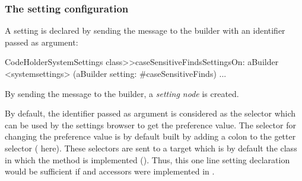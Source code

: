 \documentclass[a4paper,10pt,twoside]{book}
\begin{document}
\subsubsection{The setting configuration}
A setting is declared by sending the message  to the builder with an identifier passed as argument:
\begin{code}{}
CodeHolderSystemSettings class>>caseSensitiveFindsSettingsOn: aBuilder
	<systemsettings>
	(aBuilder setting: #caseSensitiveFinds) 
...
\end{code}
By sending the message  to the builder, a \textit{setting node} is created.

By default, the identifier passed as argument is considered as the selector which can be used by the settings browser to get the preference value. The selector for changing the preference value is by default built by adding a colon to the getter selector (\ie {} here).
These selectors are sent to a target which is by default the class in which the method is implemented (\ie {}). Thus, this one line setting declaration would be sufficient if   and  accessors were implemented in . 
\end{document}
